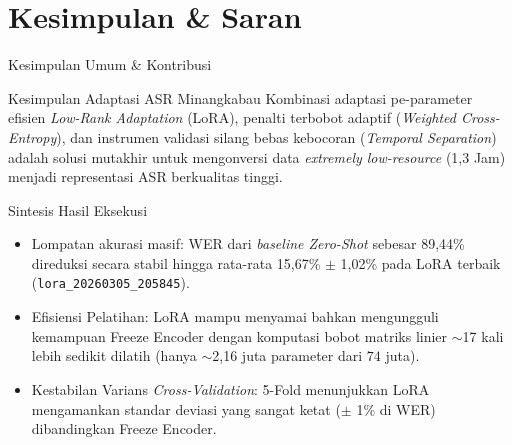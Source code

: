 \section{Kesimpulan \& Saran}

\begin{frame}{Kesimpulan Umum \& Kontribusi}
    \begin{alertblock}{Kesimpulan Adaptasi ASR Minangkabau}
        Kombinasi adaptasi pe-parameter efisien \textit{Low-Rank Adaptation} (LoRA), penalti terbobot adaptif (\textit{Weighted Cross-Entropy}), dan instrumen validasi silang bebas kebocoran (\textit{Temporal Separation}) adalah solusi mutakhir untuk mengonversi data \textit{extremely low-resource} (1,3 Jam) menjadi representasi ASR berkualitas tinggi.
    \end{alertblock}
    
    \begin{block}{Sintesis Hasil Eksekusi}
        \begin{itemize}
            \item Lompatan akurasi masif: WER dari \textit{baseline Zero-Shot} sebesar 89,44\% direduksi secara stabil hingga rata-rata 15,67\% $\pm$ 1,02\% pada LoRA terbaik (\texttt{lora\_20260305\_205845}).
            \item Efisiensi Pelatihan: LoRA mampu menyamai bahkan mengungguli kemampuan Freeze Encoder dengan komputasi bobot matriks linier $\sim$17 kali lebih sedikit dilatih (hanya $\sim$2,16 juta parameter dari $74$ juta).
            \item Kestabilan Varians \textit{Cross-Validation}: 5-Fold menunjukkan LoRA mengamankan standar deviasi yang sangat ketat ($\pm$ 1\% di WER) dibandingkan Freeze Encoder.
        \end{itemize}
    \end{block}
\end{frame}

